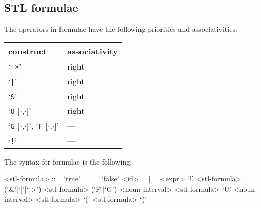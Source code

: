\documentclass[10pt,a4paper]{article}
\begin{document}
\subsection{STL formulae}

The operators in formulae have the following priorities and associativities:
\begin{table}[ht]
	\centering
    \begin{tabular}{|l|l|} \hline
		construct & associativity \\
		\hline
		`\texttt{->}' & right \\
		`\texttt{|}' & right \\
		`\texttt{\&}' & right \\
		`\texttt{U} [$\cdot$,$\cdot$]' & right \\
		`\texttt{G} [$\cdot$,$\cdot$]', `\texttt{F} [$\cdot$,$\cdot$]' & --- \\
		`\texttt{!}' & --- \\
		\hline
	\end{tabular}
\end{table}

The syntax for formulae is the following:
\begin{grammar}
<stl-formula> ::= `true' ~~|~~ `false'
\alt <id> ~~|~~ <expr>
\alt `!' <stl-formula>
 (`&'|`|'|`->') <stl-formula>
\alt (`F'|`G') <noun-interval> <stl-formula>
 `U' <noun-interval> <stl-formula>
\alt `(' <stl-formula> `)'
\end{grammar}
\end{document}
